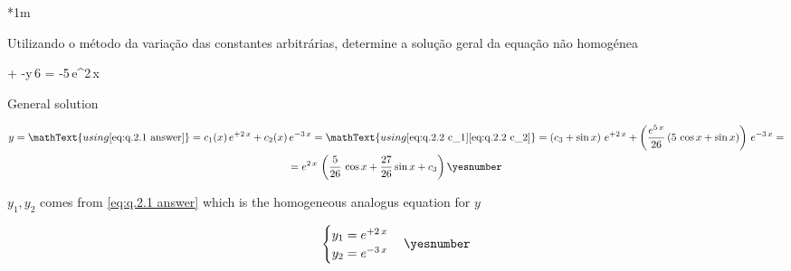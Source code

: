 \documentclass["AM3C-tests_resolutions.tex"]{subfiles}
\begin{document}
\begin{questionBox}*1m{} %

  Utilizando o método da variação das constantes arbitrárias, determine a solução geral da equação não homogénea
  \begin{BM}
    + 
    -y\,6
    = -5\,e^{2\,x}\,
  \end{BM}



  \answer{\eqref{eq:q.2.2 answer}}

  General solution
  \begin{tcolorbox}
    \begin{gather*}
      y
      = \mathText{using \eqref{eq:q.2.1 answer}}
      = c_1(x)\,e^{+2\,x}
      + c_2(x)\,e^{-3\,x}
      = \mathText{using 
        \eqref{eq:q.2.2 c_1}
        \eqref{eq:q.2.2 c_2}
      }
      = \left( c_3+\sin{x} \right)\,e^{+2\,x}
      + \left(
        \frac{e^{5\,x}}{26}
        \,(5\,\cos{x}+\sin{x})
      \right)\,e^{-3\,x}
      = \\
      = e^{2\,x}
      \,\left(
        \frac{5}{26}\,\cos{x}
        + \frac{27}{26}\sin{x}
        + c_3
      \right)
      \yesnumber\label{eq:q.2.2 answer}
    \end{gather*}
  \end{tcolorbox}

  \(y_1,y_2\) comes from \eqref{eq:q.2.1 answer} which is the homogeneous analogus equation for \(y\)
  \begin{tcolorbox}
    \begin{gather*}
      \begin{cases}
        y_1 = e^{+2\,x}
        \\
        y_2 = e^{-3\,x}
      \end{cases}
      \yesnumber\label{eq:q.2.2 y1 y2}
    \end{gather*}
  \end{tcolorbox}


\end{questionBox}
\end{document}
